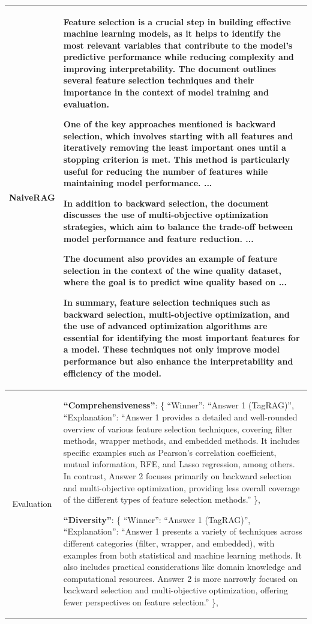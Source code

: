 \documentclass[11pt]{article}
\begin{document}
\begin{table}[h]
\begin{tabularx}{\textwidth}{p{2cm}|X}
    \hline
    
    \multicolumn{1}{c|}{NaiveRAG} &  Feature selection is a crucial step in building effective machine learning models, as it helps to identify the most relevant variables that contribute to the model's predictive performance while reducing complexity and improving interpretability. The document outlines several feature selection techniques and their importance in the context of model training and evaluation.
    
    One of the key approaches mentioned is \textbf{backward selection}, which involves starting with all features and iteratively removing the least important ones until a stopping criterion is met. This method is particularly useful for reducing the number of features while maintaining model performance. ...
    
    In addition to backward selection, the document discusses the use of \textbf{multi-objective optimization} strategies, which aim to balance the trade-off between model performance and feature reduction. ...
    
    The document also provides an example of feature selection in the context of the \textbf{wine quality dataset}, where the goal is to predict wine quality based on ...
    
    In summary, feature selection techniques such as backward selection, multi-objective optimization, and the use of advanced optimization algorithms are essential for identifying the most important features for a model. These techniques not only improve model performance but also enhance the interpretability and efficiency of the model.\\ 
    
    \hline
    
    \multicolumn{1}{c|}{Evaluation} & \textbf{``Comprehensiveness''}: \{ ``Winner'': ``Answer 1 (TagRAG)'', ``Explanation'': ``Answer 1 provides a detailed and well-rounded overview of various feature selection techniques, covering filter methods, wrapper methods, and embedded methods. It includes specific examples such as Pearson’s correlation coefficient, mutual information, RFE, and Lasso regression, among others. In contrast, Answer 2 focuses primarily on backward selection and multi-objective optimization, providing less overall coverage of the different types of feature selection methods.'' \},
    
    \textbf{``Diversity''}: \{ ``Winner'': ``Answer 1 (TagRAG)'', ``Explanation'': ``Answer 1 presents a variety of techniques across different categories (filter, wrapper, and embedded), with examples from both statistical and machine learning methods. It also includes practical considerations like domain knowledge and computational resources. Answer 2 is more narrowly focused on backward selection and multi-objective optimization, offering fewer perspectives on feature selection.'' \},
    

\end{tabularx}
\end{table}
\end{document}
